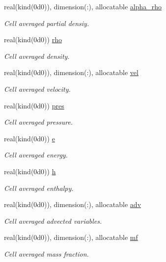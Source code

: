 \begin{DoxyCompactItemize}
real(kind(0d0)), dimension(\+:), allocatable \hyperlink{namespacem__cbc_a23d4bcbedc528222237094361a4ff43f}{alpha\+\_\+rho}
\begin{DoxyCompactList}\small\item\em Cell averaged partial densiy. \end{DoxyCompactList}\item 
real(kind(0d0)) \hyperlink{namespacem__cbc_afece2e0a449e76d45bd85eeec0207ce8}{rho}
\begin{DoxyCompactList}\small\item\em Cell averaged density. \end{DoxyCompactList}\item 
real(kind(0d0)), dimension(\+:), allocatable \hyperlink{namespacem__cbc_ad80b730485604931948331f36eb7b6e2}{vel}
\begin{DoxyCompactList}\small\item\em Cell averaged velocity. \end{DoxyCompactList}\item 
real(kind(0d0)) \hyperlink{namespacem__cbc_ad6960b075aa8db0bcc08761273a6c4c3}{pres}
\begin{DoxyCompactList}\small\item\em Cell averaged pressure. \end{DoxyCompactList}\item 
real(kind(0d0)) \hyperlink{namespacem__cbc_a4e9565add4d8b423cbcecb0da55e232c}{e}
\begin{DoxyCompactList}\small\item\em Cell averaged energy. \end{DoxyCompactList}\item 
real(kind(0d0)) \hyperlink{namespacem__cbc_afef2a31e21e4f17b6852005a08ee86ce}{h}
\begin{DoxyCompactList}\small\item\em Cell averaged enthalpy. \end{DoxyCompactList}\item 
real(kind(0d0)), dimension(\+:), allocatable \hyperlink{namespacem__cbc_af8d317b53da9384f50a1c51dd46bc8fe}{adv}
\begin{DoxyCompactList}\small\item\em Cell averaged advected variables. \end{DoxyCompactList}\item 
real(kind(0d0)), dimension(\+:), allocatable \hyperlink{namespacem__cbc_a4f6b082aae7f83fcad04d8c5d59f6d89}{mf}
\begin{DoxyCompactList}\small\item\em Cell averaged mass fraction. \end{DoxyCompactList}\item 

\end{DoxyCompactItemize}
